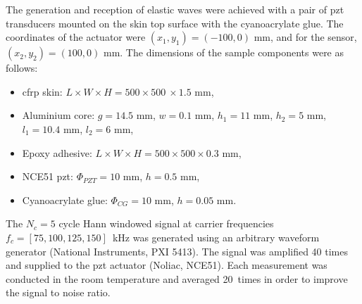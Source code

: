 The generation and reception of elastic waves were achieved with a pair of \ac{pzt} transducers mounted on the skin top surface with the cyanoacrylate glue.
The coordinates of the actuator were \((x_1,y_1)=(-100,0)\) mm,	and for the sensor, \((x_2,y_2)=(100,0)\) mm.
The dimensions of the sample components were as follows:
\begin{itemize}
	\item \ac{cfrp} skin: \(L \times W \times H = 500 \times 500\ \times 1.5\) mm,
	\item Aluminium core: \(g=14.5\) mm, \(w=0.1\) mm, \(h_1=11\) mm, \(h_2=5\) mm, \(l_1=10.4\) mm, \(l_2=6\) mm,
	\item Epoxy adhesive: \(L\times W \times H = 500 \times 500 \times 0.3\) mm,
	\item NCE51 \ac{pzt}: \(\Phi_{PZT}=10\) mm, \(h=0.5\) mm,
	\item Cyanoacrylate glue: \(\Phi_{CG}=10\) mm, \(h=0.05\) mm.
\end{itemize}

The \(N_c=5\) cycle Hann windowed signal at carrier frequencies \mbox{\(f_c=[75,100,125,150]\) kHz} was generated using an arbitrary waveform generator (National Instruments, PXI 5413).
The signal was amplified 40 times and supplied to the \ac{pzt} actuator (Noliac, NCE51).
Each measurement was conducted in the room temperature and averaged 20~times in order to improve the signal to noise ratio.